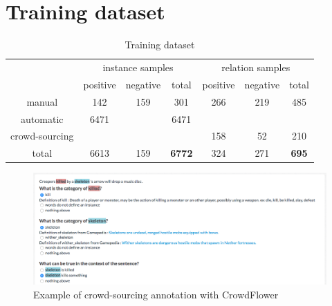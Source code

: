 \documentclass[twocolumn]{article}
\begin{document}

\section{Training dataset}

\begin{table}[t]
\center
\begin{tabular}{c||c|c|c||c|c|c}
	 & \multicolumn{3}{c||}{instance samples} & \multicolumn{3}{c}{relation samples} \\
	 & positive & negative & total & positive & negative & total \\ \hline \hline
	manual & 142 & 159 & 301 & 266 & 219 & 485\\ \hline
	automatic & 6471 & & 6471 & & & \\ \hline
	crowd-sourcing & & & & 158 & 52 & 210\\ \hline \hline
	total & 6613 & 159 & \textbf{6772} & 324 & 271 & \textbf{695}
\end{tabular}
\caption{\label{dataset} Training dataset}
\end{table}

\begin{figure}[t]
   \centering \includegraphics[width=\linewidth]{Figures/Semantic_Parsing/crowdSourcing.png}
   \caption{\label{crowdSourcing} Example of crowd-sourcing annotation with CrowdFlower}
\end{figure}
\end{document}

